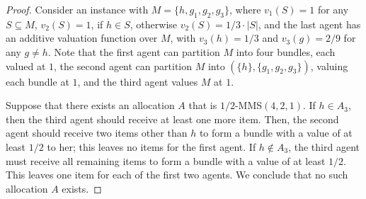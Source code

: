 \begin{proof}
    Consider an instance with $M=\{h,g_1,g_2,g_3\}$, where $v_1(S)=1$ for any $S\subseteq M$, $v_2(S)=1$, if $h\in S$, otherwise $v_2(S)=1/3 \cdot |S|$, and the last agent has an additive valuation function over $M$, with $v_3(h)=1/3$ and $v_3(g)=2/9$ for any $g\neq h$. Note that the first agent can partition $M$ into four bundles, each valued at $1$, the second agent can partition $M$ into $(\{h\},\{g_1,g_2,g_3\})$, valuing each bundle at $1$, and the third agent values $M$ at $1$.

    Suppose that there exists an allocation $A$ that is $1/2$-MMS$(4,2,1)$. If $h\in A_3$, then the third agent should receive at least one more item. Then, the second agent should receive two items other than $h$ to form a bundle with a value of at least $1/2$ to her; this leaves no items for the first agent. If $h\notin A_3$, the third agent must receive all remaining items to form a bundle with a value of at least $1/2$. This leaves one item for each of the first two agents. We conclude that no such allocation $A$ exists.  
\end{proof}

